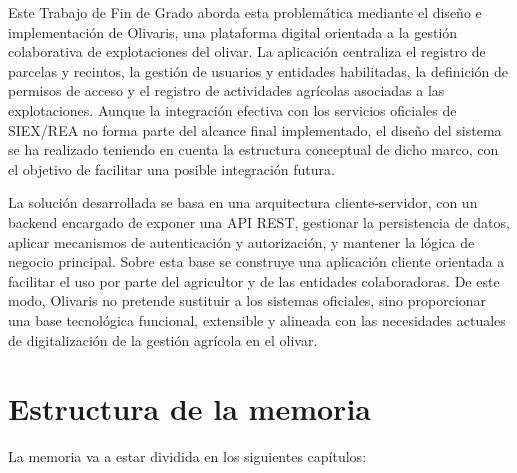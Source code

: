 Este Trabajo de Fin de Grado aborda esta problemática mediante el diseño e implementación de Olivaris, una plataforma digital orientada a la gestión colaborativa de explotaciones del olivar.
La aplicación centraliza el registro de parcelas y recintos, la gestión de usuarios y entidades habilitadas, la definición de permisos de acceso y el registro de actividades agrícolas
asociadas a las explotaciones. Aunque la integración efectiva con los servicios oficiales de SIEX/REA no forma parte del alcance final implementado, el diseño del sistema se ha realizado
teniendo en cuenta la estructura conceptual de dicho marco, con el objetivo de facilitar una posible integración futura.

La solución desarrollada se basa en una arquitectura cliente-servidor, con un backend encargado de exponer una API REST, gestionar la persistencia de datos, aplicar mecanismos de autenticación
y autorización, y mantener la lógica de negocio principal. Sobre esta base se construye una aplicación cliente orientada a facilitar el uso por parte del agricultor y de las entidades
colaboradoras. De este modo, Olivaris no pretende sustituir a los sistemas oficiales, sino proporcionar una base tecnológica funcional, extensible y alineada con las necesidades actuales de
digitalización de la gestión agrícola en el olivar.

\section{Estructura de la memoria}

La memoria va a estar dividida en los siguientes capítulos:


